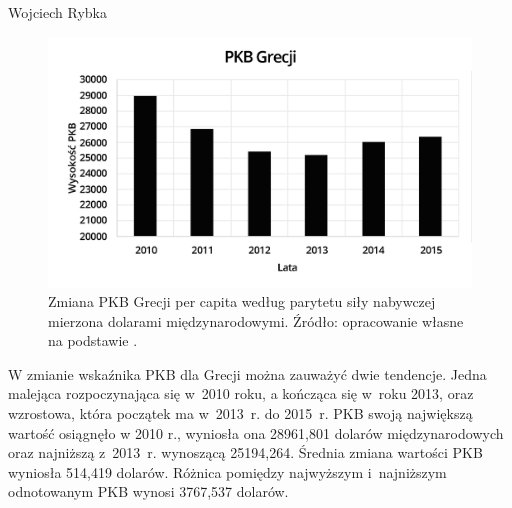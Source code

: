 \begin{artplenv}{Wojciech Rybka}
\enlargethispage{1\baselineskip}

\begin{figure}[H]
	\centering
	\includegraphics[width=1\textwidth]{ART_Rybka/pkb_grecji.png} 
	\caption{Zmiana PKB Grecji per capita według parytetu siły nabywczej mierzona dolarami międzynarodowymi.
		Źródło: opracowanie własne na podstawie
		\parencite{international_monetary_fund_world_2019a}.
	}
	\label{fig4:ryb}
\end{figure}

%
%

W zmianie wskaźnika PKB dla Grecji można zauważyć dwie tendencje. Jedna malejąca rozpoczynająca się w~2010 roku,
a kończąca się w~roku 2013, oraz wzrostowa, która początek ma w~2013~r. do 2015~r. PKB swoją największą wartość osiągnęło
w 2010 r., wyniosła ona 28961,801 dolarów międzynarodowych oraz najniższą z~2013~r. wynoszącą 25194,264. Średnia zmiana
wartości PKB wyniosła 514,419 dolarów. Różnica pomiędzy najwyższym i~najniższym odnotowanym PKB wynosi 3767,537 dolarów.



\end{artplenv}

